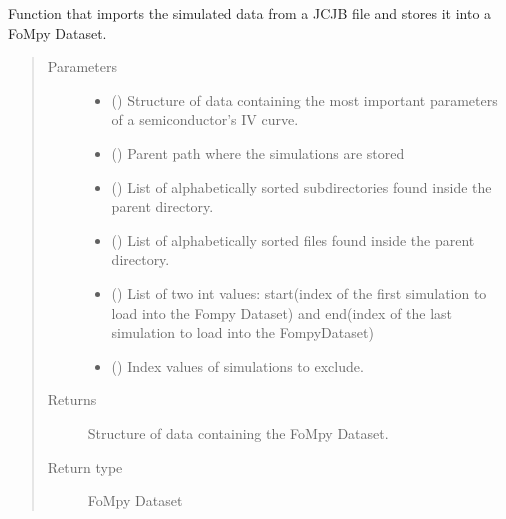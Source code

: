 \documentclass[letterpaper,10pt,english,openany, oneside]{sphinxmanual}
\begin{document}

\begin{fulllineitems}
\label{\detokenize{index:fompy.fds.JCJB}}
Function that imports the simulated data from a JCJB file and
stores it into a FoMpy Dataset.
\begin{quote}\begin{description}
\item[{Parameters}] \leavevmode\begin{itemize}
\item {} 
 () \textendash{} Structure of data containing the most important parameters of a semiconductor’s IV curve.

\item {} 
 () \textendash{} Parent path where the simulations are stored

\item {} 
 () \textendash{} List of alphabetically sorted subdirectories found inside the parent directory.

\item {} 
 () \textendash{} List of alphabetically sorted files found inside the parent directory.

\item {} 
 () \textendash{} List of two int values: start(index of the first simulation to load into the Fompy Dataset)
and end(index of the last simulation to load into the FompyDataset)

\item {} 
 () \textendash{} Index values of simulations to exclude.

\end{itemize}

\item[{Returns}] \leavevmode
{} \textendash{} Structure of data containing the FoMpy Dataset.

\item[{Return type}] \leavevmode
FoMpy Dataset

\end{description}\end{quote}

\end{fulllineitems}
\end{document}
